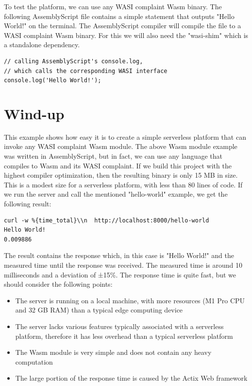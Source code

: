 %
To test the platform, we can use any WASI complaint Wasm binary. The following AssemblyScript file contains a simple statement that outputs "Hello World!" on the terminal. The AssemblyScript compiler will compile the file to a WASI complaint Wasm binary. For this we will also need the "wasi-shim" which is a standalone dependency.
%
\begin{lstlisting}[frame=lines, style=JavaScript, caption={AssemblyScript file with a simple console output}, showstringspaces=false, label={lst:as-hello-world}, captionpos=b]
// calling AssemblyScript's console.log, 
// which calls the corresponding WASI interface
console.log('Hello World!');
\end{lstlisting}

\section{Wind-up}

This example shows how easy it is to create a simple \gls{serverless} platform that can invoke any WASI complaint Wasm module. The above Wasm module example was written in AssemblyScript, but in fact, we can use any language that compiles to Wasm and its WASI complaint. If we build this project with the highest compiler optimization, then the resulting binary is only 15 MB in size. This is a modest size for a serverless platform, with less than 80 lines of code. If we run the server and call the mentioned "hello-world" example, we get the following result:
\begin{lstlisting}[frame=lines]
curl -w %{time_total}\\n  http://localhost:8000/hello-world
Hello World!
0.009886
\end{lstlisting}

The result contains the response which, in this case is "Hello World!" and the measured time until the response was received. The measured time is around 10 milliseconds and a deviation of ±15\%. The response time is quite fast, but we should consider the following points:
\begin{itemize}
    \item The server is running on a local machine, with more resources (M1 Pro CPU and 32 GB RAM) than a typical \gls{edge computing} device
    \item The server lacks various features typically associated with a \gls{serverless} platform, therefore it has less overhead than a typical serverless platform
    \item The Wasm module is very simple and does not contain any heavy computation
    \item The large portion of the response time is caused by the Actix Web framework
\end{itemize}

